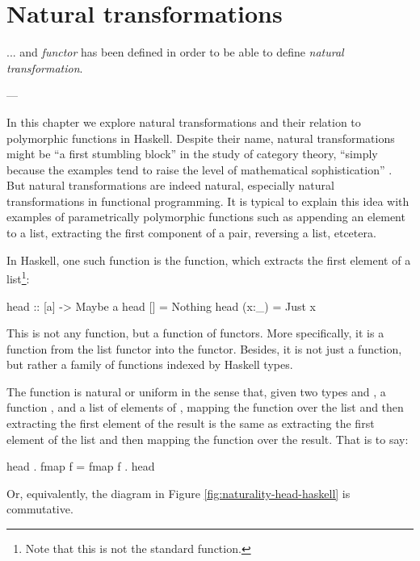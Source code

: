 \chapter{Natural transformations}
\label{chap:naturals}

\epigraph{
  ... and \emph{functor} has been defined in order to be able to
  define \emph{natural transformation}.
}{---\textcite[18]{maclane-1998}}

In this chapter we explore natural transformations and their relation
to polymorphic functions in Haskell. Despite their name, natural
transformations might be ``a first stumbling block'' in the study of
category theory, ``simply because the examples tend to raise the level
of mathematical sophistication'' \parencites[433]{poigne-1992}. But
natural transformations are indeed natural, especially natural
transformations in functional programming. It is typical to explain
this idea with examples of parametrically polymorphic functions such
as appending an element to a list, extracting the first component of a
pair, reversing a list, etcetera.

In Haskell, one such function is the  function,
which extracts the first element of a list\footnote{Note that this is
  not the standard  function.}:
\begin{codehaskell}
head :: [a] -> Maybe a
head []    = Nothing
head (x:_) = Just x
\end{codehaskell}
This is not any function, but a function of functors. More
specifically, it is a function from the list functor into the
 functor. Besides, it is not just a function, but
rather a family of functions indexed by Haskell types.

The  function is natural or uniform in the sense
that, given two types  and , a function
, and a list of elements of ,
mapping the function over the list and then extracting the first
element of the result is the same as extracting the first element of
the list and then mapping the function over the result. That is to
say:
\begin{codehaskell}
head . fmap f = fmap f . head
\end{codehaskell}
Or, equivalently, the diagram in Figure
\ref{fig:naturality-head-haskell} is commutative.

